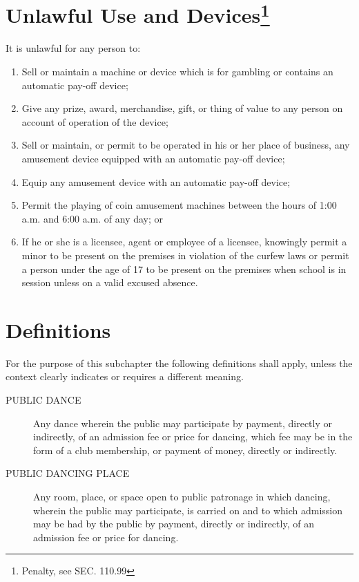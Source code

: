 \section{Unlawful Use and Devices\footnote{Penalty, see SEC. 110.99}}
It is unlawful for any person to:
\begin{enumerate}[{\indent}A)]
    \item Sell or maintain a machine or device which is for gambling or contains an automatic pay-off device; 
    \item Give any prize, award, merchandise, gift, or thing of value to any person on account of operation of the device; 
    \item Sell or maintain, or permit to be operated in his or her place of business, any amusement device equipped with an automatic pay-off device; 
    \item Equip any amusement device with an automatic pay-off device; 
    \item Permit the playing of coin amusement machines between the hours of 1:00 a.m. and 6:00 a.m. of any day; or 
    \item If he or she is a licensee, agent or employee of a licensee, knowingly permit a minor to be present on the premises in violation of the curfew laws or permit a person under the age of 17 to be present on the premises when school is in session unless on a valid excused absence. 
\end{enumerate}


\setcounter{section}{14}
\section{Definitions}
For the purpose of this subchapter the following definitions shall apply, unless the context clearly indicates or requires a different meaning.
\begin{description}
    \item[PUBLIC DANCE] Any dance wherein the public may participate by payment, directly or indirectly, of an admission fee or price for dancing, which fee may be in the form of a club membership, or payment of money, directly or indirectly.
    \item[PUBLIC DANCING PLACE] Any room, place, or space open to public patronage in which dancing, wherein the public may participate, is carried on and to which admission may be had by the public by payment, directly or indirectly, of an admission fee or price for dancing.
\end{description}

